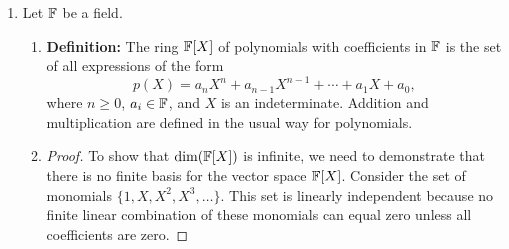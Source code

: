 \documentclass{article}
\begin{document}
\begin{enumerate}
\begin{enumerate}
\begin{proof}
            ($2 \implies 1$): Now suppose there exist projectors $P_\lambda$ satisfying the given conditions. For any $v \in V$, we can write
            \[
                v = Id_V(v) = \sum_{\lambda} P_\lambda(v).
            \]
            Each $P_\lambda(v) \in V_\lambda$, so this expresses $v$ as a sum of elements from the eigenspaces. To show uniqueness, suppose
            \[
                v = v_{\lambda_1} + v_{\lambda_2} + \cdots + v_{\lambda_k} = w_{\lambda_1} + w_{\lambda_2} + \cdots + w_{\lambda_k},
            \]
            with $v_{\lambda_i}, w_{\lambda_i} \in V_{\lambda_i}$. Applying $P_{\mu}$ to both sides, we get
            \[
                P_{\mu}(v) = P_{\mu}(v_{\lambda_1} + \cdots + v_{\lambda_k}) = v_{\mu},
            \]
            and similarly
            \[
                P_{\mu}(v) = P_{\mu}(w_{\lambda_1} + \cdots + w_{\lambda_k}) = w_{\mu}.
            \]
            Hence, $v_{\mu} = w_{\mu}$ for all $\mu$, proving uniqueness. Therefore, $V = \bigoplus_{\lambda \in \text{spec}(T)} V_\lambda$.
            Moreover, for each $\mu \in \text{spec}(T)$, we can express $P_\mu$ as
            \[
                P_\mu = \prod_{\substack{\lambda \in \text{spec}(T) \\ \lambda \neq \mu}} \left( \frac{T - \lambda \cdot Id}{\mu - \lambda} \right),
            \]
            which follows from the properties of the projectors and the definition of the eigenspaces.
        \end{proof}
    \end{enumerate}


    \item Let $\mathbb{F}$ be a field.
    \begin{enumerate}
        \item %
        \textbf{Definition: }The ring $\mathbb{F}[X]$ of polynomials with coefficients in $\mathbb{F}$ is the set of all expressions of the form
        \[
            p(X) = a_n X^n + a_{n-1} X^{n-1} + \cdots + a_1 X + a_0,
        \]
        where $n \geq 0$, $a_i \in \mathbb{F}$, and $X$ is an indeterminate. Addition and multiplication are defined in the usual way for polynomials.
        
        \item %
        \begin{proof}
            To show that $\dim(\mathbb{F}[X])$ is infinite, we need to demonstrate that there is no finite basis for the vector space $\mathbb{F}[X]$. Consider the set of monomials $\{1, X, X^2, X^3, \ldots\}$. This set is linearly independent because no finite linear combination of these monomials can equal zero unless all coefficients are zero. 


\end{proof}
\end{enumerate}
\end{enumerate}
\end{document}
